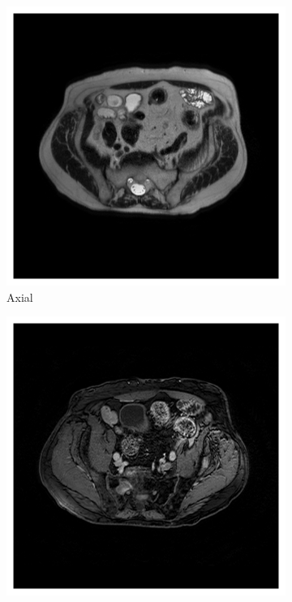 \begin{figure}[htp]
    \centering
    \begin{subfigure}[b]{0.32\textwidth}
        \centering
        \includegraphics[width=\textwidth]{./figures/axial.png}
        \caption{Axial}
        \label{fig:axial}
    \end{subfigure}
    \hfill
    \begin{subfigure}[b]{0.32\textwidth}
        \centering
        \includegraphics[width=\textwidth]{./figures/axial_postcon.png}

\end{subfigure}
\end{figure}
